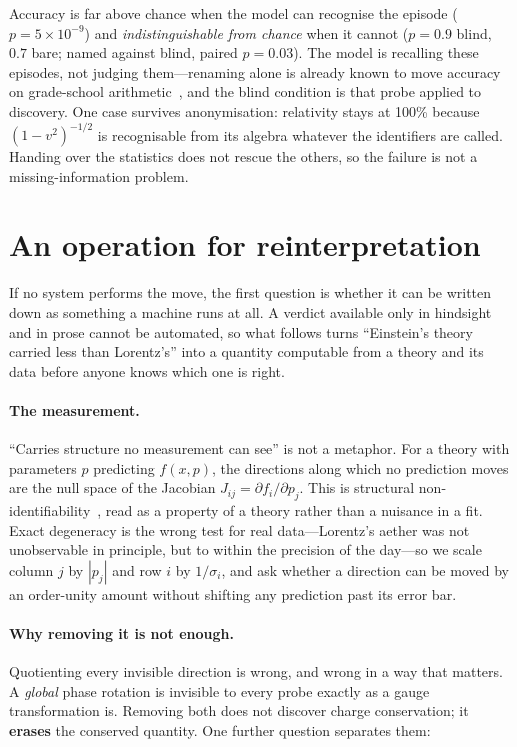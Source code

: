 \documentclass[aps,pra,twocolumn,superscriptaddress,nofootinbib,10pt]{revtex4-2}
\begin{document}
Accuracy is far above chance when the model can recognise the episode ($p=5{\times}10^{-9}$) and
\emph{indistinguishable from chance} when it cannot ($p=0.9$ blind, $0.7$ bare; named against
blind, paired $p=0.03$). The model is recalling these episodes, not judging them---renaming alone
is already known to move accuracy on grade-school arithmetic~\cite{mirzadeh2025gsmsymbolic}, and
the blind condition is that probe applied to discovery. One case survives anonymisation:
relativity stays at 100\% because $(1-v^{2})^{-1/2}$ is recognisable from its algebra whatever
the identifiers are called. Handing over the statistics does not rescue the others, so the
failure is not a missing-information problem.

\section{An operation for reinterpretation}
\label{sec:mech}

If no system performs the move, the first question is whether it can be written down as something
a machine runs at all. A verdict available only in hindsight and in prose cannot be automated, so
what follows turns ``Einstein's theory carried less than Lorentz's'' into a quantity computable
from a theory and its data before anyone knows which one is right.

\paragraph{The measurement.} ``Carries structure no measurement can see'' is not a metaphor. For
a theory with parameters $p$ predicting $f(x,p)$, the directions along which no prediction moves
are the null space of the Jacobian $J_{ij}=\partial f_i/\partial p_j$. This is structural
non-identifiability~\cite{raue2009identifiability}, read as a property of a theory rather than a
nuisance in a fit. Exact degeneracy is the wrong test for real data---Lorentz's aether was not
unobservable in principle, but to within the precision of the day---so we scale column $j$ by
$|p_j|$ and row $i$ by $1/\sigma_i$, and ask whether a direction can be moved by an order-unity
amount without shifting any prediction past its error bar.

\paragraph{Why removing it is not enough.} Quotienting every invisible direction is wrong, and
wrong in a way that matters. A \emph{global} phase rotation is invisible to every probe exactly
as a gauge transformation is. Removing both does not discover charge conservation; it
\textbf{erases} the conserved quantity. One further question separates them:
\end{document}
